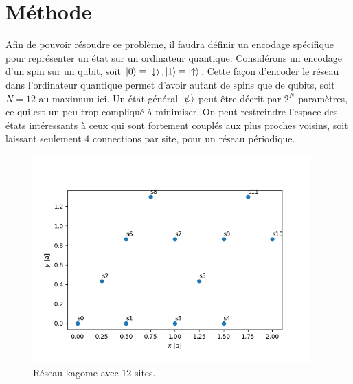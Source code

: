 \documentclass[../main.tex]{subfiles}
\begin{document}
    \section{Méthode} %
    \label{sec:Méthode}
    Afin de pouvoir résoudre ce problème, il faudra définir un encodage
    spécifique pour représenter un état sur un ordinateur quantique.
    Considérons un encodage d'un spin sur un qubit, soit $\ket{0}\equiv
    \ket{\downarrow}, \ket{1}\equiv\ket{\uparrow}$. Cette façon d'encoder le
    réseau dans l'ordinateur quantique permet d'avoir autant de spins que de
    qubits, soit $N=12$ au maximum ici. Un état général $\ket{\psi}$ peut être
    décrit par $2^N$ paramètres, ce qui est un peu trop compliqué à minimiser.
    On peut restreindre l'espace des états intéressants à ceux qui sont
    fortement couplés aux plus proches voisins, soit laissant seulement $4$
    connections par site, pour un réseau périodique.

    \begin{figure}[h]
        \begin{center}
            \includegraphics[width=0.95\textwidth]{../figs/reskagome.png}
        \end{center}
        \caption{Réseau kagome avec $12$ sites.}
        \label{fig:kagome}
    \end{figure}
    
    

\clearpage
\end{document}
